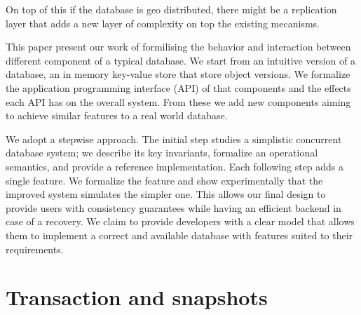 \documentclass[parallelisme]{compas2022}
\begin{document}
On top of this if the database is geo distributed, there might be a replication layer that adds a new layer of complexity on top the existing mecanisms.

This paper present our work of formilising the behavior and  interaction between different component of a typical database.
We start from an intuitive version of a database, an in memory key-value store that store object versions.
We formalize the application programming interface (API) of that components and the effects each API has on the overall system.
From these we add new components aiming to achieve similar features to a real world database.

We adopt a stepwise approach.
The initial step studies a simplistic concurrent database system; we describe its key invariants, formalize an operational semantics, and provide a reference implementation.
Each following step adds a single feature.
We formalize the feature and show experimentally that the improved system simulates the simpler one.
This allows our final design to provide users with consistency guarantees while having an efficient backend in case of a recovery.
We claim to provide developers with a clear model that allows them to implement a correct and available database with features suited to their requirements.





\section{Transaction and snapshots}
\end{document}

